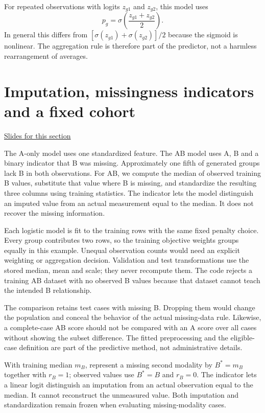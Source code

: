 \documentclass[11pt,letterpaper]{article}
\theoremstyle{definition}\newtheorem{definition}{Definition}\newtheorem{example}{Example}
\numberwithin{equation}{section}
\begin{document}
For repeated observations with logits $z_{g1}$ and $z_{g2}$, this model uses
\[
 p_g=\sigma\!\left(\frac{z_{g1}+z_{g2}}2\right).
\]
In general this differs from $[\sigma(z_{g1})+\sigma(z_{g2})]/2$ because the sigmoid is nonlinear. The aggregation rule is therefore part of the predictor, not a harmless rearrangement of averages.
\section{Imputation, missingness indicators and a fixed cohort}
\hypertarget{note-imputation-missingness-indicators-and-a-fixed-cohort}{}\label{note:imputation-missingness-indicators-and-a-fixed-cohort}
{\small \href{slides.html\#frame=represent-a-missing-measurement\&step=1}{Slides for this section}}\par
The A-only model uses one standardized feature. The AB model uses A, B and a binary indicator that B was missing. Approximately one fifth of generated groups lack B in both observations. For AB, we compute the median of observed training B values, substitute that value where B is missing, and standardize the resulting three columns using training statistics. The indicator lets the model distinguish an imputed value from an actual measurement equal to the median. It does not recover the missing information.

Each logistic model is fit to the training rows with the same fixed penalty choice. Every group contributes two rows, so the training objective weights groups equally in this example. Unequal observation counts would need an explicit weighting or aggregation decision. Validation and test transformations use the stored median, mean and scale; they never recompute them. The code rejects a training AB dataset with no observed B values because that dataset cannot teach the intended B relationship.

The comparison retains test cases with missing B. Dropping them would change the population and conceal the behavior of the actual missing-data rule. Likewise, a complete-case AB score should not be compared with an A score over all cases without showing the subset difference. The fitted preprocessing and the eligible-case definition are part of the predictive method, not administrative details.

With training median $m_B$, represent a missing second modality by $B^*=m_B$ together with $r_B=1$; observed values use $B^*=B$ and $r_B=0$. The indicator lets a linear logit distinguish an imputation from an actual observation equal to the median. It cannot reconstruct the unmeasured value. Both imputation and standardization remain frozen when evaluating missing-modality cases.
\end{document}
